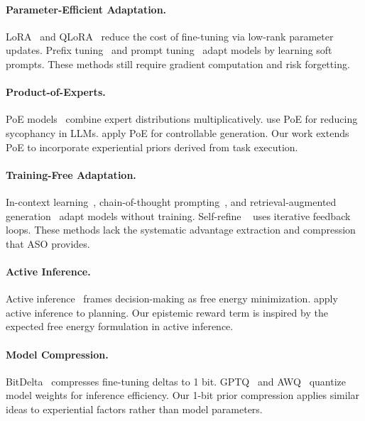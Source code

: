 \documentclass[11pt]{article}
\begin{document}
\paragraph{Parameter-Efficient Adaptation.}
LoRA~\cite{hu2022lora} and QLoRA~\cite{dettmers2024qlora} reduce the cost
of fine-tuning via low-rank parameter updates. Prefix
tuning~\cite{li2021prefix} and prompt tuning~\cite{lester2021power} adapt
models by learning soft prompts. These methods still require gradient
computation and risk forgetting.

\paragraph{Product-of-Experts.}
PoE models~\cite{hinton2002training} combine expert distributions
multiplicatively. \cite{du2023reducing} use PoE for reducing sycophancy in
LLMs. \cite{liu2024tuning} apply PoE for controllable generation. Our work
extends PoE to incorporate experiential priors derived from task execution.

\paragraph{Training-Free Adaptation.}
In-context learning~\cite{brown2020language}, chain-of-thought
prompting~\cite{wei2022chain}, and retrieval-augmented
generation~\cite{lewis2020retrieval} adapt models without training. Self-refine
~\cite{madaan2023selfrefine} uses iterative feedback loops. These methods lack
the systematic advantage extraction and compression that ASO provides.

\paragraph{Active Inference.}
Active inference~\cite{friston2017active, parr2022active} frames
decision-making as free energy minimization. \cite{sajid2021active} apply
active inference to planning. Our epistemic reward term is inspired by the
expected free energy formulation in active inference.

\paragraph{Model Compression.}
BitDelta~\cite{liu2024bitdelta} compresses fine-tuning deltas to 1 bit.
GPTQ~\cite{frantar2023gptq} and AWQ~\cite{lin2024awq} quantize model weights
for inference efficiency. Our 1-bit prior compression applies similar ideas to
experiential factors rather than model parameters.
\end{document}
